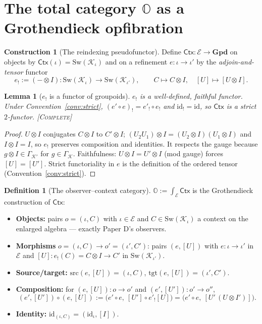 \documentclass[11pt]{article}
\newtheorem{lemma}{Lemma}
\theoremstyle{definition}
\newtheorem{definition}{Definition}
\newtheorem{construction}{Construction}
\theoremstyle{remark}
\newcommand{\K}{\mathcal K}
\newcommand{\Ecat}{\mathcal E}
\newcommand{\Oc}{\mathbb O}
\newcommand{\Sw}{\mathrm{Sw}}
\newcommand{\Ctx}{\mathsf{Ctx}}
\newcommand{\Gpd}{\mathbf{Gpd}}
\newcommand{\id}{\mathrm{id}}
\newcommand{\pushf}[1]{{#1}_{!}}
\newcommand{\STC}{{\normalfont\textsc{[Complete]}}}
\begin{document}
\section{The total category \texorpdfstring{$\Oc$}{O} as a Grothendieck opfibration}
\label{sec:total}

\begin{construction}[The reindexing pseudofunctor]\label{con:pf}
Define $\Ctx:\Ecat\to\Gpd$ on objects by $\Ctx(\iota)=\Sw(\K_\iota)$ and on a
refinement $e:\iota\to\iota'$ by the \emph{adjoin-and-tensor} functor
\[
\pushf{e}:=(-\otimes I):\Sw(\K_\iota)\to\Sw(\K_{\iota'}),\qquad
C\mapsto C\otimes I,\quad [U]\mapsto[U\otimes I].
\]
\end{construction}

\begin{lemma}[$\pushf{e}$ is a functor of groupoids]\label{lem:reindex}
$\pushf e$ is a well-defined, faithful functor. Under Convention~\ref{conv:strict},
$\pushf{(e'\circ e)}=\pushf{e'}\circ\pushf{e}$ and $\pushf{\id}=\id$, so $\Ctx$ is a
strict $2$-functor. \STC
\end{lemma}
\begin{proof}
$U\otimes I$ conjugates $C\otimes I$ to $C'\otimes I$; $(U_2U_1)\otimes
I=(U_2\otimes I)(U_1\otimes I)$ and $I\otimes I=I$, so $\pushf e$ preserves composition
and identities. It respects the gauge because $g\otimes I\in\Gamma_{\K'}$ for
$g\in\Gamma_\K$. Faithfulness: $U\otimes I=U'\otimes I$ (mod gauge) forces $[U]=[U']$.
Strict functoriality in $e$ is the definition of the ordered tensor
(Convention~\ref{conv:strict}). \end{proof}

\begin{definition}[The observer--context category]\label{def:O}
$\Oc:=\displaystyle\int_{\Ecat}\Ctx$ is the Grothendieck construction of $\Ctx$:
\begin{itemize}[leftmargin=1.4em]
\item \textbf{Objects:} pairs $o=(\iota,C)$ with $\iota\in\Ecat$ and $C\in\Sw(\K_\iota)$
a context on the enlarged algebra --- exactly Paper D's observers.
\item \textbf{Morphisms} $o=(\iota,C)\to o'=(\iota',C')$: pairs $(e,[U])$ with
$e:\iota\to\iota'$ in $\Ecat$ and $[U]:\pushf e(C)=C\otimes I\to C'$ in
$\Sw(\K_{\iota'})$.
\item \textbf{Source/target:} $\mathrm{src}(e,[U])=(\iota,C)$,
$\mathrm{tgt}(e,[U])=(\iota',C')$.
\item \textbf{Composition:} for $(e,[U]):o\to o'$ and $(e',[U']):o'\to o''$,
\begin{equation}\label{eq:comp}
(e',[U'])\circ(e,[U]):=\bigl(e'\circ e,\ [U']\circ\pushf{e'}[U]\bigr)
=\bigl(e'\circ e,\ [U'\,(U\otimes I')]\bigr).
\end{equation}
\item \textbf{Identity:} $\id_{(\iota,C)}=(\id_\iota,[I])$.
\end{itemize}
\end{definition}
\end{document}
